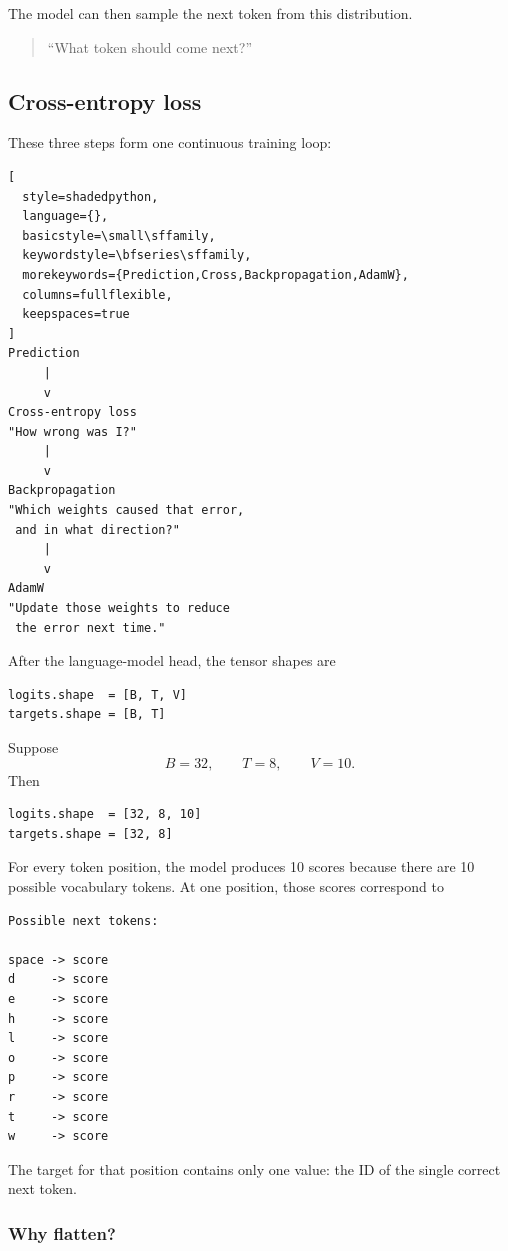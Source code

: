The model can then sample the next token from this distribution. \\

\begin{quote}
  ``What token should come next?''
\end{quote} 


\subsection{Cross-entropy loss}

These three steps form one continuous training loop:
\begin{lstlisting}[
  style=shadedpython,
  language={},
  basicstyle=\small\sffamily,
  keywordstyle=\bfseries\sffamily,
  morekeywords={Prediction,Cross,Backpropagation,AdamW},
  columns=fullflexible,
  keepspaces=true
]
Prediction
     |
     v
Cross-entropy loss
"How wrong was I?"
     |
     v
Backpropagation
"Which weights caused that error,
 and in what direction?"
     |
     v
AdamW
"Update those weights to reduce
 the error next time."
\end{lstlisting}

After the language-model head, the tensor shapes are
\begin{lstlisting}[style=shadedpython]
logits.shape  = [B, T, V]
targets.shape = [B, T]
\end{lstlisting}

Suppose
\[
  B=32,\qquad T=8,\qquad V=10.
\]
Then
\begin{lstlisting}[style=shadedpython]
logits.shape  = [32, 8, 10]
targets.shape = [32, 8]
\end{lstlisting}

For every token position, the model produces 10 scores because there are 10
possible vocabulary tokens. At one position, those scores correspond to
\begin{lstlisting}[style=shadedpython,language={}]
Possible next tokens:

space -> score
d     -> score
e     -> score
h     -> score
l     -> score
o     -> score
p     -> score
r     -> score
t     -> score
w     -> score
\end{lstlisting}
The target for that position contains only one value:
the ID of the single correct next token.

\subsubsection*{Why flatten?}


